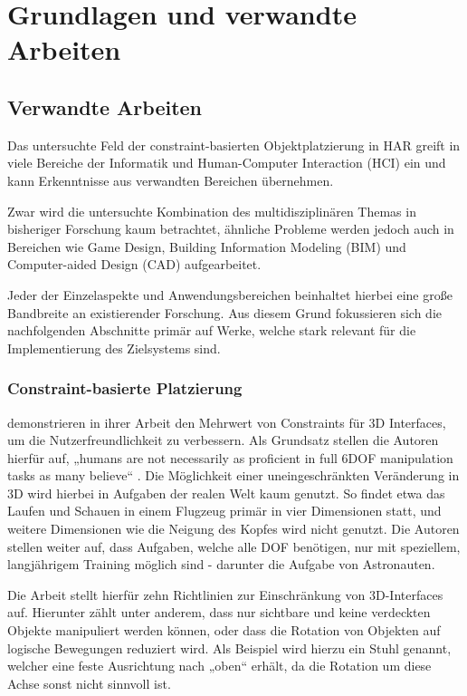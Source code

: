 \section{Grundlagen und verwandte Arbeiten}\label{section:Grundlagen und verwandte Arbeiten}

\subsection{Verwandte Arbeiten}

Das untersuchte Feld der constraint-basierten Objektplatzierung in HAR greift in viele Bereiche der Informatik und Human-Computer Interaction (HCI) ein und kann Erkenntnisse aus verwandten Bereichen übernehmen.

Zwar wird die untersuchte Kombination des multidisziplinären Themas in bisheriger Forschung kaum betrachtet, ähnliche Probleme werden jedoch auch in Bereichen wie Game Design, Building Information Modeling (BIM) und Computer-aided Design (CAD) aufgearbeitet.

Jeder der Einzelaspekte und Anwendungsbereichen beinhaltet hierbei eine große Bandbreite an existierender Forschung. Aus diesem Grund fokussieren sich die nachfolgenden Abschnitte primär auf Werke, welche stark relevant für die Implementierung des Zielsystems sind.

\subsubsection{Constraint-basierte Platzierung}

\textcite{stuerzlingerValueConstraints3D2011a} demonstrieren in ihrer Arbeit den Mehrwert von Constraints für 3D Interfaces, um die Nutzerfreundlichkeit zu verbessern. Als Grundsatz stellen die Autoren hierfür auf, „humans are not necessarily as proficient in full 6DOF manipulation tasks as many believe“ \parencite[S. 9]{stuerzlingerValueConstraints3D2011a}. Die Möglichkeit einer uneingeschränkten Veränderung in 3D wird hierbei in Aufgaben der realen Welt kaum genutzt. So findet etwa das Laufen und Schauen in einem Flugzeug primär in vier Dimensionen statt, und weitere Dimensionen wie die Neigung des Kopfes wird nicht genutzt. Die Autoren stellen weiter auf, dass Aufgaben, welche alle DOF benötigen, nur mit speziellem, langjährigem Training möglich sind - darunter die Aufgabe von Astronauten.

Die Arbeit stellt hierfür zehn Richtlinien zur Einschränkung von 3D-Interfaces auf. Hierunter zählt unter anderem, dass nur sichtbare und keine verdeckten Objekte manipuliert werden können, oder dass die Rotation von Objekten auf logische Bewegungen reduziert wird. Als Beispiel wird hierzu ein Stuhl genannt, welcher eine feste Ausrichtung nach „oben“ erhält, da die Rotation um diese Achse sonst nicht sinnvoll ist.

